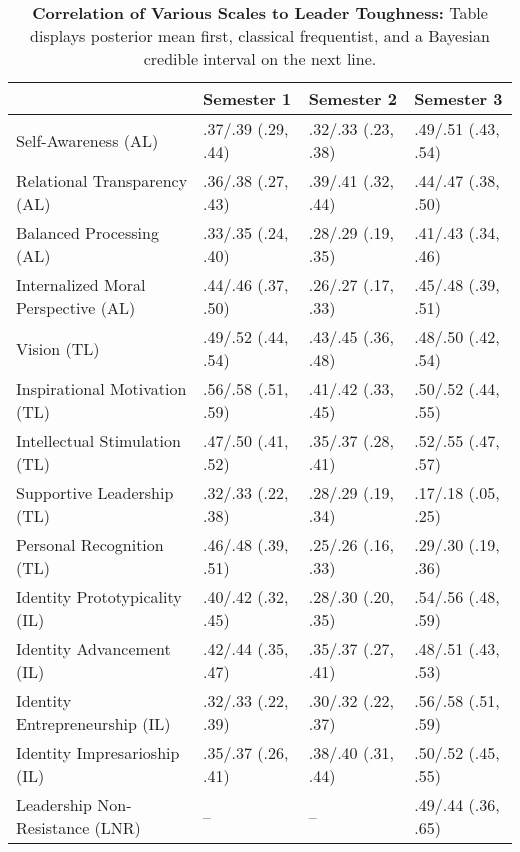 \begin{table}[ht]
\centering
\begin{tabular}{llll}
  \hline
 & Semester 1 & Semester 2 & Semester 3 \\ 
  \hline
Self-Awareness (AL) & .37/.39 (.29, .44) & .32/.33 (.23, .38) & .49/.51 (.43, .54) \\ 
  Relational Transparency (AL) & .36/.38 (.27, .43) & .39/.41 (.32, .44) & .44/.47 (.38, .50) \\ 
  Balanced Processing (AL) & .33/.35 (.24, .40) & .28/.29 (.19, .35) & .41/.43 (.34, .46) \\ 
  Internalized Moral Perspective (AL) & .44/.46 (.37, .50) & .26/.27 (.17, .33) & .45/.48 (.39, .51) \\ 
  Vision (TL) & .49/.52 (.44, .54) & .43/.45 (.36, .48) & .48/.50 (.42, .54) \\ 
  Inspirational Motivation (TL) & .56/.58 (.51, .59) & .41/.42 (.33, .45) & .50/.52 (.44, .55) \\ 
  Intellectual Stimulation (TL) & .47/.50 (.41, .52) & .35/.37 (.28, .41) & .52/.55 (.47, .57) \\ 
  Supportive Leadership (TL) & .32/.33 (.22, .38) & .28/.29 (.19, .34) & .17/.18 (.05, .25) \\ 
  Personal Recognition (TL) & .46/.48 (.39, .51) & .25/.26 (.16, .33) & .29/.30 (.19, .36) \\ 
  Identity Prototypicality (IL) & .40/.42 (.32, .45) & .28/.30 (.20, .35) & .54/.56 (.48, .59) \\ 
  Identity Advancement (IL) & .42/.44 (.35, .47) & .35/.37 (.27, .41) & .48/.51 (.43, .53) \\ 
  Identity Entrepreneurship (IL) & .32/.33 (.22, .39) & .30/.32 (.22, .37) & .56/.58 (.51, .59) \\ 
  Identity Impresarioship (IL) & .35/.37 (.26, .41) & .38/.40 (.31, .44) & .50/.52 (.45, .55) \\ 
  Leadership Non-Resistance (LNR) & -- & -- & .49/.44 (.36, .65) \\ 
   \hline
\end{tabular}
\caption{\textbf{Correlation of Various Scales to Leader Toughness:} Table displays posterior mean first, classical frequentist, and a Bayesian credible interval on the next line.} 
\label{tab:lead_corr}
\end{table}
